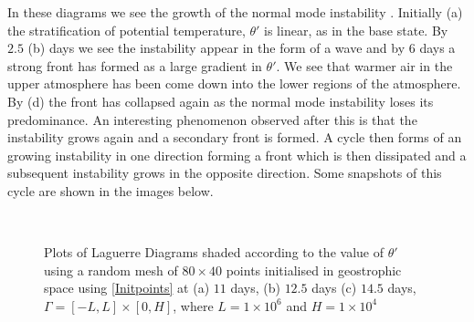 In these diagrams we see the growth of the normal mode instability . Initially (a) the stratification of potential temperature, $\theta '$ is linear, as in the base state. By $2.5$ (b) days we see the instability appear in the form of a wave and by $6$ days a strong front has formed as a large gradient in $\theta '$. We see that warmer air in the upper atmosphere has been come down into the lower regions of the atmosphere. By (d) the front has collapsed again as the normal mode instability loses its predominance. An interesting phenomenon observed after this is that the instability grows again and a secondary front is formed. A cycle then forms of an growing instability in one direction forming a front which is then dissipated and a subsequent instability grows in the opposite direction. Some snapshots of this cycle are shown in the images below. 

\begin{figure}[h]
	\centering
	\\
	\caption{Plots of Laguerre Diagrams shaded according to the value of $\theta '$ using a random mesh of $80 \times 40$ points initialised in geostrophic space using \ref{Initpoints} at (a) $11$ days, (b) $12.5$ days (c) $14.5$ days, $\Gamma = [-L,L]\times[0,H]$, where $L = 1\times10^6$ and $H = 1\times10^4$}
	\label{fig: front_cycle}
\end{figure}

